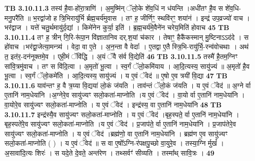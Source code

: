 \documentclass[17pt]{extarticle}
\begin{document}
{{{{{{{{{{{{{{{{{{{{{{                                \textbf{ TB 3.10.11.3} \newline
                  तस्य॑ है॒वा-हो॑रा॒त्राणि॑ । अ॒मुष्मि॑न् ॅलो॒के शे॑व॒धिं न ध॑यन्ति ।अधी॑तꣳ है॒व स शे॑व॒धि-मनु॒परै॑ति ॥ भ॒रद्वा॑जो ह त्रि॒भिरायु॑र्भि र्ब्रह्म॒चर्य॑मुवास । तꣳ ह॒ जीर्णिꣳ॒॒ स्थवि॑रꣳ॒॒ शया॑नं । इन्द्र॑ उप॒व्रज्यो॑ वाच । भर॑द्वाज । यत्ते॑ चतु॒र्थमायु॑र्द॒द्यां । किमे॑नेन कुर्या॒ इति॑ । ब्र॒ह्म॒चर्य॑मे॒वैने॑न चरेय॒मिति॑ होवाच \textbf{ 45} \newline
                  \newline
                                \textbf{ TB 3.10.11.4} \newline
                  तꣳ ह॒ त्रीन् गि॒रि-रू॑पा॒न वि॑ज्ञातानिव दर्.श॒यां च॑कार । तेषाꣳ॒॒ हैकै॑कस्मान् मु॒ष्टिनाऽऽद॑दे । स हो॑वाच ।भर॑द्वा॒जेत्या॒मन्त्र्य॑ । वेदा॒ वा ए॒ते । अ॒न॒न्ता वै वेदाः᳚ । ए॒तद्वा ए॒तै स्त्रि॒भि-रायु॑र्भि॒-रन्व॑वोचथाः । अथ॑ त॒ इत॑र॒-दन॑नूक्तमे॒व । एही॒मं ॅवि॑द्धि । अ॒यं ॅवै स॑र्व वि॒द्येति॑ \textbf{ 46} \newline
                  \newline
                                \textbf{ TB 3.10.11.5} \newline
                  तस्मै॑ है॒तम॒ग्निꣳ सा॑वि॒त्रमु॑वाच । तꣳ स वि॑दि॒त्वा । अ॒मृतो॑ भू॒त्वा । स्व॒र्गं ॅलो॒कमि॑याय । आ॒दि॒त्यस्य॒ सायु॑ज्यं ॥ अ॒मृतो॑ है॒व भू॒त्वा । स्व॒र्गं ॅलो॒कमे॑ति । आ॒दि॒त्यस्य॒ सायु॑ज्यं । य ए॒वं ॅवेद॑ ॥ ए॒षो ए॒व त्रयी॑ वि॒द्या \textbf{ 47} \newline
                  \newline
                                \textbf{ TB 3.10.11.6} \newline
                  याव॑न्तꣳ ह॒ वै त्र॒य्या वि॒द्यया॑ लो॒कं ज॑यति । ताव॑न्तं ॅलो॒कं ज॑यति । य ए॒वं ॅवेद॑ ॥ अ॒ग्ने र्वा ए॒तानि॑ नाम॒धेया॑नि ।अ॒ग्नेरे॒व सायु॑ज्यꣳ सलो॒कता॑-माप्नोति ।य ए॒वं ॅवेद॑ । वा॒यो र्वा ए॒तानि॑ नाम॒धेया॑नि । वा॒योरे॒व सायु॑ज्यꣳ सलो॒कता॑-माप्नोति । य ए॒वं ॅवेद॑ । इन्द्र॑स्य॒ वा ए॒तानि॑ नाम॒धेया॑नि \textbf{ 48} \newline
                  \newline
                                \textbf{ TB 3.10.11.7} \newline
                  इन्द्र॑स्यै॒व सायु॑ज्यꣳ सलो॒कता॑-माप्नोति । य ए॒वं ॅवेद॑ ।बृह॒स्पते॒ र्वा ए॒तानि॑ नाम॒धेया॑नि । बृह॒स्पते॑रे॒व सायु॑ज्यꣳ सलो॒कता॑-माप्नोति ।य ए॒वं ॅवेद॑ । प्र॒जाप॑ते॒ र्वा ए॒तानि॑ नाम॒धेया॑नि । प्र॒जाप॑तेरे॒व सायु॑ज्यꣳ सलो॒कता॑-माप्नोति । य ए॒वं ॅवेद॑ ।ब्रह्म॑णो॒ वा ए॒तानि॑ नाम॒धेया॑नि । ब्रह्म॑ण ए॒व सायु॑ज्यꣳ सलो॒कता॑-माप्नोति ( ) । य ए॒वं ॅवेद॑ ॥ स वा ए॒षो᳚ऽग्नि-र॑पक्षपु॒च्छो वा॒युरे॒व । तस्या॒ग्नि र्मुखं᳚ । अ॒सावा॑दि॒त्यः शिरः॑ । स यदे॒ते दे॒वते॒ अन्त॑रेण । तथ्सर्वꣳ॑ सीव्यति । तस्मा᳚थ् सावि॒त्रः । \textbf{ 49} \newline
}}}}}}}}}}}}}}}}}}}}}}
\end{document}

